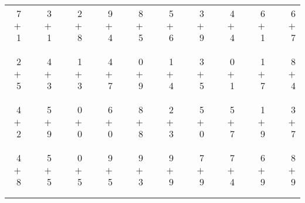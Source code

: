 \documentclass[12pt, letterpaper]{article}
\begin{document}
\begin{tabular}{rrrrrrrrrrrrrrrrrrr}
7 & & 3 & & 2 & & 9 & & 8 & & 5 & & 3 & & 4 & & 6 & & 6\\
$+$ 1 & & $+$ 1 & & $+$ 8 & & $+$ 4 & & $+$ 5 & & $+$ 6 & & $+$ 9 & & $+$ 4 & & $+$ 1 & & $+$ 7\\
\cline{1-1} \cline{3-3} \cline{5-5} \cline{7-7} \cline{9-9} \cline{11-11} \cline{13-13} \cline{15-15} \cline{17-17} \cline{19-19} \\ \\
2 & & 4 & & 1 & & 4 & & 0 & & 1 & & 3 & & 0 & & 1 & & 8\\
$+$ 5 & & $+$ 3 & & $+$ 3 & & $+$ 7 & & $+$ 9 & & $+$ 4 & & $+$ 5 & & $+$ 1 & & $+$ 7 & & $+$ 4\\
\cline{1-1} \cline{3-3} \cline{5-5} \cline{7-7} \cline{9-9} \cline{11-11} \cline{13-13} \cline{15-15} \cline{17-17} \cline{19-19} \\ \\
4 & & 5 & & 0 & & 6 & & 8 & & 2 & & 5 & & 5 & & 1 & & 3\\
$+$ 2 & & $+$ 9 & & $+$ 0 & & $+$ 0 & & $+$ 8 & & $+$ 3 & & $+$ 0 & & $+$ 7 & & $+$ 9 & & $+$ 7\\
\cline{1-1} \cline{3-3} \cline{5-5} \cline{7-7} \cline{9-9} \cline{11-11} \cline{13-13} \cline{15-15} \cline{17-17} \cline{19-19} \\ \\
4 & & 5 & & 0 & & 9 & & 9 & & 9 & & 7 & & 7 & & 6 & & 8\\
$+$ 8 & & $+$ 5 & & $+$ 5 & & $+$ 5 & & $+$ 3 & & $+$ 9 & & $+$ 9 & & $+$ 4 & & $+$ 9 & & $+$ 9\\
\cline{1-1} \cline{3-3} \cline{5-5} \cline{7-7} \cline{9-9} \cline{11-11} \cline{13-13} \cline{15-15} \cline{17-17} \cline{19-19} \\ \\
\end{tabular}
\newpage
\end{document}
